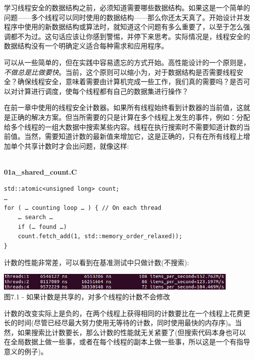 
学习线程安全的数据结构之前，必须知道需要哪些数据结构。如果这是一个简单的问题——多个线程可以同时使用的数据结构——那么你还太天真了。开始设计并发程序中使用的新数据结构或算法时，就知道这个问题有多么重要了，以至于怎么强调都不为过。这句话应该让你感到警惕，并停下来思考。实际情况是，线程安全的数据结构没有一个明确定义适合每种需求和应用程序。


可以从一些简单的，但在实践中容易遗忘的方式开始。高性能设计的一个原则是，\textit{不做总是比做要快}。当前，这个原则可以缩小为，对于数据结构是否需要线程安全？确保线程安全，意味着需要由计算机完成一些工作，我们真的需要吗？是否可以对计算进行调度，使每个线程都有自己的数据集进行操作？

在前一章中使用的线程安全计数器。如果所有线程始终看到计数器的当前值，这就是正确的解决方案。但当所需要的只是计算在多个线程上发生的事件，例如：分配给多个线程的一组大数据中搜索某些内容。线程在执行搜索时不需要知道计数的当前值。当然，需要知道计数的最新值来增加它，这是正确的，只有在所有线程上增加单个共享计数时才会出问题，就像这样:

\hspace*{\fill} \\ %
\noindent
\textbf{01a\_shared\_count.C}
\begin{lstlisting}[style=styleCXX]
std::atomic<unsigned long> count;
…
for ( … counting loop … ) { // On each thread
	… search …
	if (… found …)
	count.fetch_add(1, std::memory_order_relaxed));
}
\end{lstlisting}

计数的性能非常差，可以看到在基准测试中只做计数(不搜索):

\begin{center}
\includegraphics[width=0.9\textwidth]{content/2/chapter7/images/1.jpg}\\
图7.1 - 如果计数是共享的，对多个线程的计数不会修改
\end{center}

计数的改变实际上是负的，在两个线程上获得相同的计数要比在一个线程上花费更长的时间(尽管已经尽最大努力使用无等待的计数，同时使用最快的内存序)。当然，如果搜索比计数要长，那么计数的性能就无关紧要了(但搜索代码本身也可以在全局数据上做一些事，或者在每个线程的副本上做一些事，所以这是一个有指导意义的例子)。


